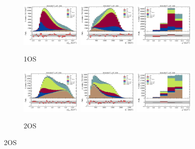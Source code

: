\begin{figure}[htb]
    \centering
    \begin{subfigure}{\textwidth}
        \includegraphics[width=0.32\textwidth]{./figs-supplemental-plots/init-fit/ctrl/fit_result-stacked-D0-1os-mmiss2.pdf}
        \includegraphics[width=0.32\textwidth]{./figs-supplemental-plots/init-fit/ctrl/fit_result-stacked-D0-1os-el.pdf}
        \includegraphics[width=0.32\textwidth]{./figs-supplemental-plots/init-fit/ctrl/fit_result-stacked-D0-1os-q2.pdf}
        \caption{1OS}
    \end{subfigure}

    \begin{subfigure}{\textwidth}
        \includegraphics[width=0.32\textwidth]{./figs-supplemental-plots/init-fit/ctrl/fit_result-stacked-D0-2os-mmiss2.pdf}
        \includegraphics[width=0.32\textwidth]{./figs-supplemental-plots/init-fit/ctrl/fit_result-stacked-D0-2os-el.pdf}
        \includegraphics[width=0.32\textwidth]{./figs-supplemental-plots/init-fit/ctrl/fit_result-stacked-D0-2os-q2.pdf}
        \caption{2OS}
    \end{subfigure}


\end{figure}
